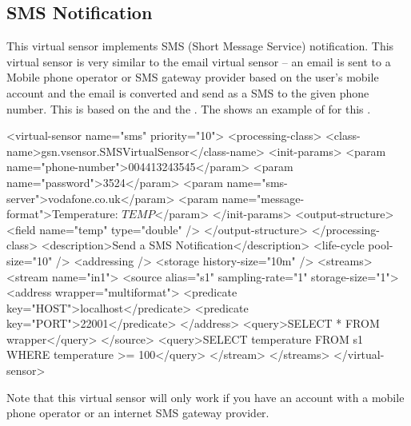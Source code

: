 \subsection{SMS Notification \vs \label{sms:vsp}}

This virtual sensor implements SMS (Short Message Service) notification. This virtual sensor is very similar to the email virtual sensor – an email is sent to a Mobile phone operator or SMS gateway provider based on the user's mobile account and the email is converted and send as a SMS to the given phone number.
This \vs is based on the  \vsp and the  \wrapper.
The  shows an example of \vsd for this \vs.

\begin{xmlcode}[caption={Sample of SMS Notification VSD file}, label=listing:xml:smsnotification_vsd]
<virtual-sensor name="sms" priority="10">
	<processing-class>
		<class-name>gsn.vsensor.SMSVirtualSensor</class-name>
		<init-params>
			<param name="phone-number">004413243545</param>
			<param name="password">3524</param>
			<param name="sms-server">vodafone.co.uk</param>
			<param name="message-format">Temperature: $TEMP$</param>
		</init-params>
		<output-structure>
			<field name="temp" type="double" />
		</output-structure>
	</processing-class>
	<description>Send a SMS Notification</description>
	<life-cycle pool-size="10" />
	<addressing />
	<storage history-size="10m" />
	<streams>
		<stream name="in1">
			<source alias="s1" sampling-rate="1" storage-size="1">
				<address wrapper="multiformat">
					<predicate key="HOST">localhost</predicate>
					<predicate key="PORT">22001</predicate>
				</address>
				<query>SELECT * FROM wrapper</query>
			</source>
			<query>SELECT temperature FROM s1 WHERE temperature >= 100</query>
		</stream>
	</streams>
</virtual-sensor>
\end{xmlcode}

Note that this virtual sensor will only work if you have an account with a mobile phone operator or an internet SMS gateway provider. 